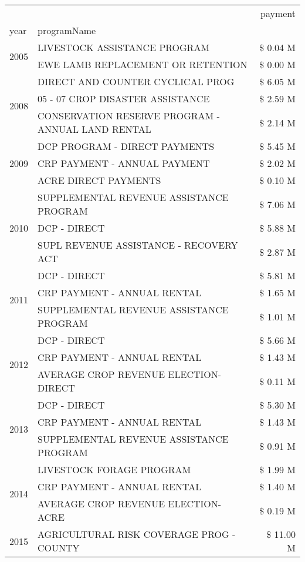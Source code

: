 \begin{tabular}{llr}
\toprule
 &  & payment \\
year & programName &  \\
\midrule
\multirow[t]{2}{*}{2005} & LIVESTOCK ASSISTANCE PROGRAM & \$ 0.04 M \\
 & EWE LAMB REPLACEMENT OR RETENTION & \$ 0.00 M \\
\cline{1-3}
\multirow[t]{3}{*}{2008} & DIRECT AND COUNTER CYCLICAL PROG & \$ 6.05 M \\
 & 05 - 07 CROP DISASTER ASSISTANCE & \$ 2.59 M \\
 & CONSERVATION RESERVE PROGRAM - ANNUAL LAND RENTAL & \$ 2.14 M \\
\cline{1-3}
\multirow[t]{3}{*}{2009} & DCP PROGRAM - DIRECT PAYMENTS & \$ 5.45 M \\
 & CRP PAYMENT - ANNUAL PAYMENT & \$ 2.02 M \\
 & ACRE DIRECT PAYMENTS & \$ 0.10 M \\
\cline{1-3}
\multirow[t]{3}{*}{2010} & SUPPLEMENTAL REVENUE ASSISTANCE PROGRAM & \$ 7.06 M \\
 & DCP - DIRECT & \$ 5.88 M \\
 & SUPL REVENUE ASSISTANCE - RECOVERY ACT & \$ 2.87 M \\
\cline{1-3}
\multirow[t]{3}{*}{2011} & DCP - DIRECT & \$ 5.81 M \\
 & CRP PAYMENT - ANNUAL RENTAL & \$ 1.65 M \\
 & SUPPLEMENTAL REVENUE ASSISTANCE PROGRAM & \$ 1.01 M \\
\cline{1-3}
\multirow[t]{3}{*}{2012} & DCP - DIRECT & \$ 5.66 M \\
 & CRP PAYMENT - ANNUAL RENTAL & \$ 1.43 M \\
 & AVERAGE CROP REVENUE ELECTION-DIRECT & \$ 0.11 M \\
\cline{1-3}
\multirow[t]{3}{*}{2013} & DCP - DIRECT & \$ 5.30 M \\
 & CRP PAYMENT - ANNUAL RENTAL & \$ 1.43 M \\
 & SUPPLEMENTAL REVENUE ASSISTANCE PROGRAM & \$ 0.91 M \\
\cline{1-3}
\multirow[t]{3}{*}{2014} & LIVESTOCK FORAGE PROGRAM & \$ 1.99 M \\
 & CRP PAYMENT - ANNUAL RENTAL & \$ 1.40 M \\
 & AVERAGE CROP REVENUE ELECTION-ACRE & \$ 0.19 M \\
\cline{1-3}
\multirow[t]{3}{*}{2015} & AGRICULTURAL RISK COVERAGE PROG - COUNTY & \$ 11.00 M \\

\end{tabular}
